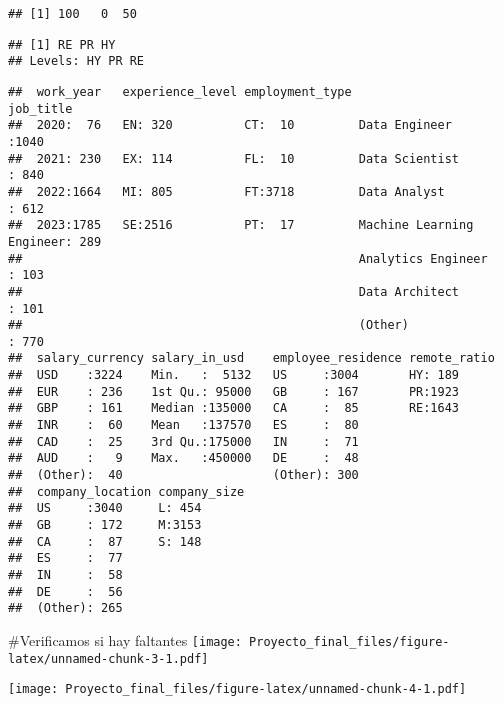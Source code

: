 \documentclass[
]{article}
\begin{document}
\begin{verbatim}
## [1] 100   0  50
\end{verbatim}

\begin{verbatim}
## [1] RE PR HY
## Levels: HY PR RE
\end{verbatim}

\begin{verbatim}
##  work_year   experience_level employment_type                     job_title   
##  2020:  76   EN: 320          CT:  10         Data Engineer            :1040  
##  2021: 230   EX: 114          FL:  10         Data Scientist           : 840  
##  2022:1664   MI: 805          FT:3718         Data Analyst             : 612  
##  2023:1785   SE:2516          PT:  17         Machine Learning Engineer: 289  
##                                               Analytics Engineer       : 103  
##                                               Data Architect           : 101  
##                                               (Other)                  : 770  
##  salary_currency salary_in_usd    employee_residence remote_ratio
##  USD    :3224    Min.   :  5132   US     :3004       HY: 189     
##  EUR    : 236    1st Qu.: 95000   GB     : 167       PR:1923     
##  GBP    : 161    Median :135000   CA     :  85       RE:1643     
##  INR    :  60    Mean   :137570   ES     :  80                   
##  CAD    :  25    3rd Qu.:175000   IN     :  71                   
##  AUD    :   9    Max.   :450000   DE     :  48                   
##  (Other):  40                     (Other): 300                   
##  company_location company_size
##  US     :3040     L: 454      
##  GB     : 172     M:3153      
##  CA     :  87     S: 148      
##  ES     :  77                 
##  IN     :  58                 
##  DE     :  56                 
##  (Other): 265
\end{verbatim}

\#Verificamos si hay faltantes
\texttt{[image: Proyecto\_final\_files/figure-latex/unnamed-chunk-3-1.pdf]}

\texttt{[image: Proyecto\_final\_files/figure-latex/unnamed-chunk-4-1.pdf]}
\end{document}
